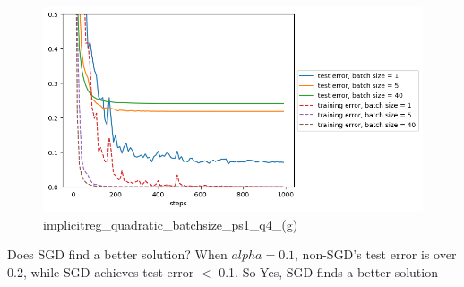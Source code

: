 
\begin{answer}
\begin{figure}[H]
    \centering
    \includegraphics[width=0.5\linewidth]{implicitreg_quadratic_batchsize.png}
    \caption{implicitreg\_quadratic\_batchsize\_ps1\_q4\_(g)}
    \label{fig:enter-label}
\end{figure}

Does SGD find a better solution? When $alpha = 0.1$, non-SGD's test error is over 0.2, while SGD achieves test error $<$ 0.1. So Yes, SGD finds a better solution

\end{answer}